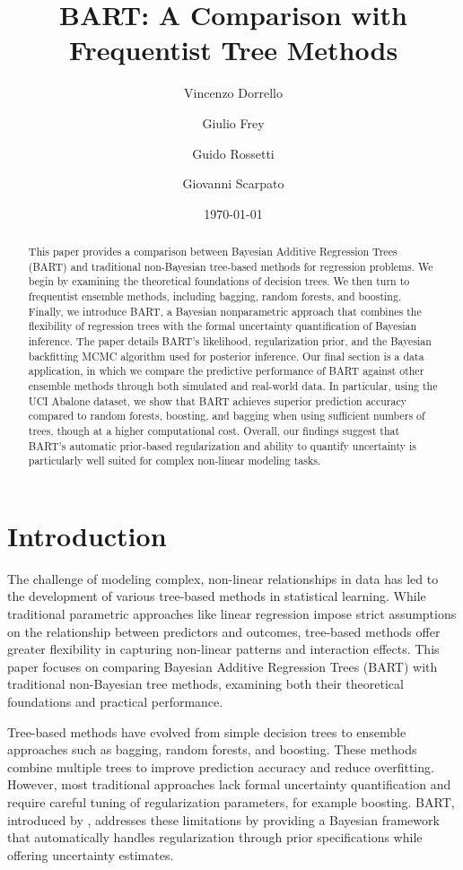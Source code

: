 \documentclass[a4paper,11pt]{article}
\title{BART: A Comparison with Frequentist Tree Methods}
\author{
    Vincenzo Dorrello 
    \and
    Giulio Frey 
    \and
    Guido Rossetti 
    \and
    Giovanni Scarpato 
}
\date{\today}
\begin{document}
\maketitle

\begin{abstract}
This paper provides a comparison between Bayesian Additive Regression Trees (BART) and traditional non-Bayesian tree-based methods for regression problems. We begin by examining the theoretical foundations of decision trees. We then turn to frequentist ensemble methods, including bagging, random forests, and boosting. Finally, we introduce BART, a Bayesian nonparametric approach that combines the flexibility of regression trees with the formal uncertainty quantification of Bayesian inference. The paper details BART's likelihood, regularization prior, and the Bayesian backfitting MCMC algorithm used for posterior inference. Our final section is a data application, in which we compare the predictive performance of BART against other ensemble methods through both simulated and real-world data. In particular, using the UCI Abalone dataset, we show that BART achieves superior prediction accuracy compared to random forests, boosting, and bagging when using sufficient numbers of trees, though at a higher computational cost. Overall, our findings suggest that BART's automatic prior-based regularization and ability to quantify uncertainty is particularly well suited for complex non-linear modeling tasks.
\end{abstract}

\newpage

\section{Introduction}


The challenge of modeling complex, non-linear relationships in data has led to the development of various tree-based methods in statistical learning. While traditional parametric approaches like linear regression impose strict assumptions on the relationship between predictors and outcomes, tree-based methods offer greater flexibility in capturing non-linear patterns and interaction effects. This paper focuses on comparing Bayesian Additive Regression Trees (BART) with traditional non-Bayesian tree methods, examining both their theoretical foundations and practical performance.

Tree-based methods have evolved from simple decision trees to ensemble approaches such as bagging, random forests, and boosting. These methods combine multiple trees to improve prediction accuracy and reduce overfitting. However, most traditional approaches lack formal uncertainty quantification and require careful tuning of regularization parameters, for example boosting. BART, introduced by \cite{chipmanBARTBayesianAdditive2010}, addresses these limitations by providing a Bayesian framework that automatically handles regularization through prior specifications while offering uncertainty estimates.
\end{document}
